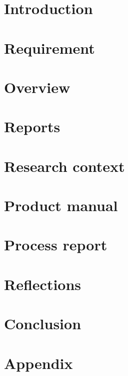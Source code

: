\documentclass[a4paper,11pt]{report}
\begin{document}
\begin{abstract}
\end{abstract}

\newpage
\listoftodos   %

\newpage
\tableofcontents
\newpage

\chapter{Introduction}

\chapter{Requirement}


\chapter{Overview}


\chapter{Reports}


\chapter{Research context}


\chapter{Product manual}


\chapter{Process report}


\chapter{Reflections}



\chapter{Conclusion}


\appendix
\chapter{Appendix}

\end{document}
